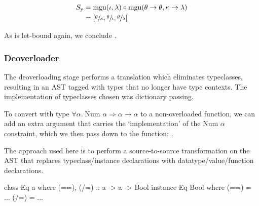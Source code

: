 \documentclass[dissertation.tex]{subfiles}
\begin{document}
{{{\begin{figure}[H]
            \begin{subfigure}[c]{\textwidth}
                \centering
                \begin{equation*}
                \begin{split}
                    S_\text{y} & = \text{mgu}(\iota, \lambda) \circ \text{mgu}(\theta\rightarrow\theta, \kappa\rightarrow\lambda) \\
                               & = [\sfrac{\theta}{\kappa}, \sfrac{\theta}{\iota}, \sfrac{\theta}{\lambda}]
                \end{split}
                \end{equation*}
            \end{subfigure}
            \end{figure}

            As  is let-bound again, we conclude .

        }
        \subsubsection{Deoverloader}
        {

            The deoverloading stage performs a translation which eliminates typeclasses, resulting in an AST tagged with
            types that no longer have type contexts. The implementation of typeclasses chosen was dictionary passing.

            To convert  with type \(\forall \alpha.\; \text{Num }\alpha \Rightarrow
            \alpha\rightarrow\alpha\) to a non-overloaded function, we can add an extra argument that carries the
            `implementation' of the \(\text{Num }\alpha\) constraint, which we then pass down to the \haskell{+}
            function: .


            The approach used here is to perform a source-to-source transformation on the AST that replaces
            typeclass/instance declarations with datatype/value/function declarations.

            \begin{haskellfigure}
            class Eq a where
                (==), (/=) :: a -> a -> Bool
            instance Eq Bool where
                (==) = ...
                (/=) = ...
            \end{haskellfigure}

}}}
\end{document}
